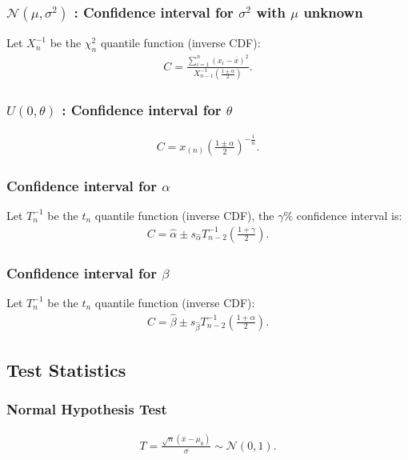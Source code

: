 \documentclass[a4paper, 12pt, twoside]{article}
\begin{document}
\subsubsection{$\mathcal{N}(\mu, \sigma^2)$ : Confidence
    interval for $\sigma^2$ with $\mu$ unknown}
Let $X_n^{-1}$ be the $\chi^2_n$ quantile function (inverse CDF):
\begin{align*}
    C = \frac{\sum_{i = 1}^n(x_i - \overline{x})^2}
    {X_{n-1}^{-1}\left(\frac{1 \pm \alpha}{2}\right)}.
\end{align*}

\subsubsection{$U(0, \theta)$ : Confidence interval for $\theta$}
\begin{align*}
    C = x_{(n)}\left(\frac{1 \pm \alpha}{2}\right)^{-\frac{1}{n}}.
\end{align*}

\subsubsection{Confidence interval for $\alpha$}
Let $T^{-1}_n$ be the $t_n$ quantile function (inverse CDF),
the $\gamma\%$ confidence interval is:
\begin{align*}
    C = \hat\alpha \pm s_{\hat\alpha}
    T^{-1}_{n - 2}\left(\frac{1 + \gamma}{2}\right).
\end{align*}

\subsubsection{Confidence interval for $\beta$}
Let $T^{-1}_n$ be the $t_n$ quantile function (inverse CDF):
\begin{align*}
    C = \hat\beta \pm s_{\hat\beta}
    T^{-1}_{n - 2}\left(\frac{1 + \alpha}{2}\right).
\end{align*}

\subsection{Test Statistics}

\subsubsection{Normal Hypothesis Test}
\begin{gather*}
    T = \frac{\sqrt{n}(\overline{x} - \mu_0)}{\sigma}
    \sim \mathcal{N}(0, 1).
\end{gather*}
\end{document}
